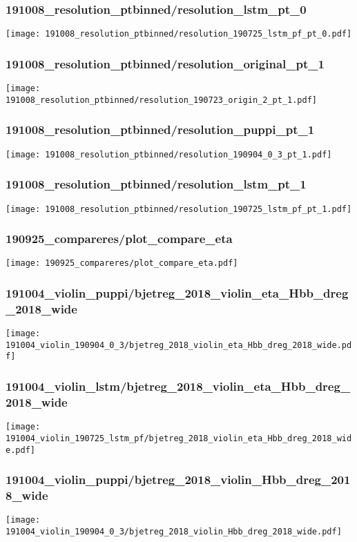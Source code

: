 \begin{frame}
   \frametitle{\small 191008\_resolution\_ptbinned/resolution\_lstm\_pt\_0}
   \centering
   \texttt{[image: 191008\_resolution\_ptbinned/resolution\_190725\_lstm\_pf\_pt\_0.pdf]}
\end{frame}

\begin{frame}
   \frametitle{\small 191008\_resolution\_ptbinned/resolution\_original\_pt\_1}
   \centering
   \texttt{[image: 191008\_resolution\_ptbinned/resolution\_190723\_origin\_2\_pt\_1.pdf]}
\end{frame}

\begin{frame}
   \frametitle{\small 191008\_resolution\_ptbinned/resolution\_puppi\_pt\_1}
   \centering
   \texttt{[image: 191008\_resolution\_ptbinned/resolution\_190904\_0\_3\_pt\_1.pdf]}
\end{frame}

\begin{frame}
   \frametitle{\small 191008\_resolution\_ptbinned/resolution\_lstm\_pt\_1}
   \centering
   \texttt{[image: 191008\_resolution\_ptbinned/resolution\_190725\_lstm\_pf\_pt\_1.pdf]}
\end{frame}

\begin{frame}
   \frametitle{\small 190925\_compareres/plot\_compare\_eta}
   \centering
   \texttt{[image: 190925\_compareres/plot\_compare\_eta.pdf]}
\end{frame}

\begin{frame}
   \frametitle{\small 191004\_violin\_puppi/bjetreg\_2018\_violin\_eta\_Hbb\_dreg\_2018\_wide}
   \centering
   \texttt{[image: 191004\_violin\_190904\_0\_3/bjetreg\_2018\_violin\_eta\_Hbb\_dreg\_2018\_wide.pdf]}
\end{frame}

\begin{frame}
   \frametitle{\small 191004\_violin\_lstm/bjetreg\_2018\_violin\_eta\_Hbb\_dreg\_2018\_wide}
   \centering
   \texttt{[image: 191004\_violin\_190725\_lstm\_pf/bjetreg\_2018\_violin\_eta\_Hbb\_dreg\_2018\_wide.pdf]}
\end{frame}

\begin{frame}
   \frametitle{\small 191004\_violin\_puppi/bjetreg\_2018\_violin\_Hbb\_dreg\_2018\_wide}
   \centering
   \texttt{[image: 191004\_violin\_190904\_0\_3/bjetreg\_2018\_violin\_Hbb\_dreg\_2018\_wide.pdf]}
\end{frame}

